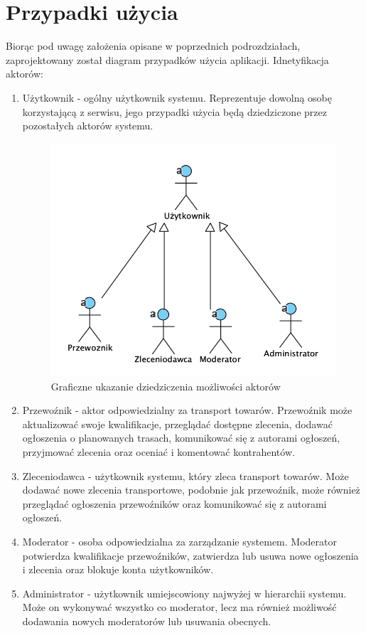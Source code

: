 \section{Przypadki użycia}
Biorąc pod uwagę założenia opisane w poprzednich podrozdziałach, zaprojektowany został diagram przypadków użycia aplikacji. Idnetyfikacja aktorów:
\begin{enumerate}
\item Użytkownik - ogólny użytkownik systemu. Reprezentuje dowolną osobę korzystającą z serwisu, jego przypadki użycia będą dziedziczone przez pozostałych aktorów systemu.
\begin{figure}[H]
	\centering
		\includegraphics[width=0.6\linewidth]{rozdzial1/dziedziczenie.png}
	\caption{Graficzne ukazanie dziedziczenia możliwości aktorów}
	\label{Rys. fig:Graficzne ukazanie dziedziczenia możliwości aktorów}
\end{figure}
\item Przewoźnik - aktor odpowiedzialny za transport towarów. Przewoźnik może aktualizować swoje kwalifikacje, przeglądać dostępne zlecenia, dodawać ogłoszenia o planowanych trasach, komunikować się z autorami ogłoszeń, przyjmować zlecenia oraz oceniać i komentować kontrahentów.
\item Zleceniodawca - użytkownik systemu, który zleca transport towarów. Może dodawać nowe zlecenia transportowe, podobnie jak przewoźnik, może również przeglądać ogłoszenia przewoźników oraz komunikować się z autorami ogłoszeń.
\item Moderator - osoba odpowiedzialna za zarządzanie systemem. Moderator potwierdza kwalifikacje przewoźników, zatwierdza lub usuwa nowe ogłoszenia i zlecenia oraz blokuje konta użytkowników.
\item Administrator - użytkownik umiejscowiony najwyżej w hierarchii systemu. Może on wykonywać wszystko co moderator, lecz ma również możliwość dodawania nowych moderatorów lub usuwania obecnych.
\end{enumerate}

